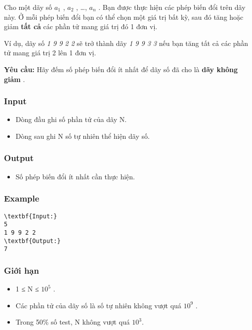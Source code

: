 

Cho một dãy số $a_{1}$ , $a_{2}$ , …, $a_{n}$ . Bạn được thực hiện các phép biến đổi trên dãy này. Ở mỗi phép biến đổi bạn có thể chọn một giá trị bất kỳ, sau đó tăng hoặc giảm \textbf{ tất cả } các phần tử mang giá trị đó 1 đơn vị.

Ví dụ, dãy số \emph{ 1 9 9 2 2 } sẽ trở thành dãy \emph{ 1 9 9 3 3 } nếu bạn tăng tất cả các phần tử mang giá trị 2 lên 1 đơn vị.

\textbf{Yêu cầu: } Hãy đếm số phép biến đổi ít nhất để dãy số đã cho là \textbf{ dãy không giảm } .

\subsubsection{Input}
\begin{itemize}
	\item Dòng đầu ghi số phần tử của dãy N.
	\item Dòng sau ghi N số tự nhiên thể hiện dãy số.
\end{itemize}

\subsubsection{Output}
\begin{itemize}
	\item Số phép biến đổi ít nhất cần thực hiện.
\end{itemize}

\subsubsection{Example}
\begin{verbatim}
\textbf{Input:}
5
1 9 9 2 2
\textbf{Output:}
7\end{verbatim}

\subsubsection{Giới hạn}
\begin{itemize}
	\item 1 ≤ N ≤ $10^{5}$ .
	\item Các phần tử của dãy số là số tự nhiên không vượt quá $10^{9}$ .
	\item Trong 50\% số test, N không vượt quá $10^{3}$.
\end{itemize}
